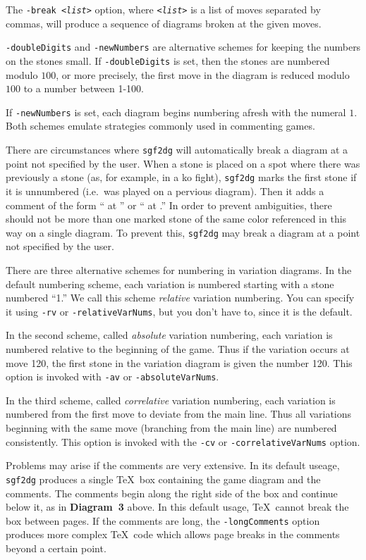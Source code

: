 The {\tt -break <{\it list\/}>} option, where {\tt<{\it list\/}>} is a list of
moves separated by commas, will produce a sequence of diagrams broken at the
given moves.

{\tt -doubleDigits} and {\tt -newNumbers} are alternative schemes for
keeping the numbers on the stones small. If {\tt -doubleDigits} is set,
then the stones are numbered modulo $100$, or more precisely, the first
move in the diagram is reduced modulo $100$ to a number between 1-100.

If {\tt -newNumbers} is set, each diagram begins numbering afresh with the
numeral $1$. Both schemes emulate strategies commonly used in commenting
games.

There are circumstances where {\tt sgf2dg} will automatically break
a diagram at a point not specified by the user. When a stone is placed
on a spot where there was previously a stone (as, for example, in a
ko fight), {\tt sgf2dg} marks the first stone if it is unnumbered
(i.e.\ was played on a pervious diagram). Then it adds a comment
of the form `` at '' or
`` at \textstone{\goo\- ;;}.'' 
In order to prevent ambiguities, there should not be more than one marked
stone of the same color referenced in this way on a single diagram. To prevent
this, {\tt sgf2dg} may break a diagram at a point not specified by the user.

There are three alternative schemes for numbering in variation diagrams.
In the default numbering scheme, each variation is numbered starting
with a stone numbered ``1.'' We call this scheme {\it relative} variation
numbering. You can specify it using {\tt -rv} or {\tt -relativeVarNums}, but
you don't have to, since it is the default.

In the second scheme, called {\it absolute} variation numbering, each
variation is numbered relative to the beginning of the game. Thus
if the variation occurs at move 120, the first stone in the variation
diagram is given the number 120. This option is invoked with {\tt -av} or 
{\tt -absoluteVarNums}.

In the third scheme, called {\it correlative} variation numbering, each
variation is numbered from the first move to deviate from the main line.
Thus all variations beginning with the same move (branching from the
main line) are numbered consistently. This option is invoked with
the {\tt -cv} or {\tt -correlativeVarNums} option.

Problems may arise if the comments are very extensive. In its default
useage, {\tt sgf2dg} produces a single \TeX\ box containing the
game diagram and the comments. The comments begin along the right
side of the box and continue below it, as in {\bf Diagram~3} above. 
In this default usage, \TeX\ cannot break the box between pages. If the
comments are long, the {\tt -longComments} option produces more
complex \TeX\ code which allows page breaks in the comments beyond a
certain point.

